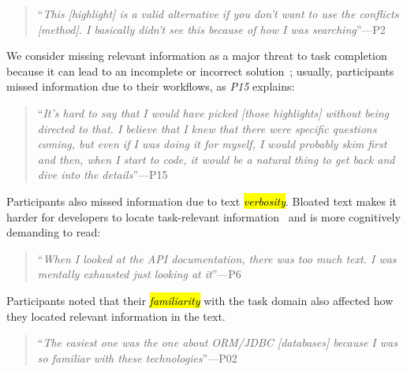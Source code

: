\smallskip
\begin{footnotesize}
\begin{quote}
    ``\textit{This [highlight] is a valid alternative if you don't want to use the conflicts [method]. I basically didn't see this because of how I was searching}''---P2
\end{quote}
\end{footnotesize}




We consider missing relevant information as a major threat to task completion because it can lead to an incomplete or incorrect solution~\cite{Murphy2005};
usually, participants missed information due to their workflows, as \textit{P15} explains:





\smallskip
\begin{footnotesize}
\begin{quote}
    ``\textit{It's hard to say that I would have picked [those highlights] without being directed to that. I believe that I knew that there were specific questions coming, but even if I was doing it for myself, I would probably skim first and then, when I start to code, it would be a natural thing to get back and dive into the details}''---P15
\end{quote}
\end{footnotesize}



Participants also missed information due to text \hl{\textit{verbosity}}. 
Bloated text makes it harder for developers to locate task-relevant information~\cite{Robillard2011} and is more cognitively demanding to read:


\smallskip
\begin{footnotesize}
\begin{quote}
    ``\textit{When I looked at the API documentation, there was too much text. I was mentally exhausted just looking at it}''---P6
\end{quote}
\end{footnotesize}


Participants noted that their \hl{\textit{familiarity}} with the task domain also affected how they located relevant information in the text.



\smallskip
\begin{footnotesize}
\begin{quote}
    ``\textit{The easiest one was the one about ORM/JDBC [databases] because I was so familiar with these technologies}''---P02
\end{quote}
\end{footnotesize}




